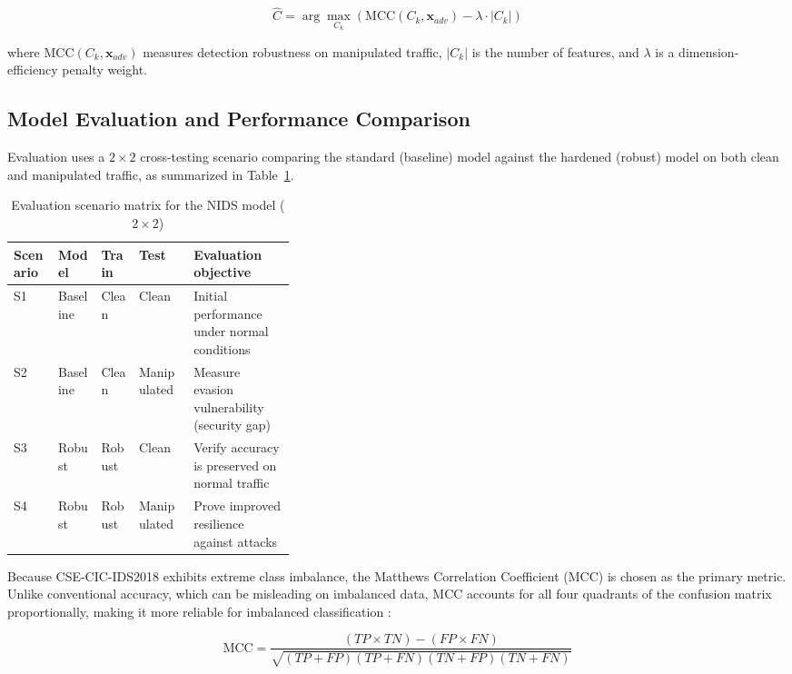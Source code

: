 \documentclass[11pt, a4paper]{article}
\begin{document}
\begin{equation}
\hat{C} = \arg\max_{C_k} \left( \text{MCC}(C_k, \mathbf{x}_{adv}) - \lambda \cdot |C_k| \right)
\end{equation}

where $\text{MCC}(C_k, \mathbf{x}_{adv})$ measures detection robustness on manipulated traffic, $|C_k|$ is the number of features, and $\lambda$ is a dimension-efficiency penalty weight.

\subsection{Model Evaluation and Performance Comparison}
Evaluation uses a $2\times 2$ cross-testing scenario comparing the standard (baseline) model against the hardened (robust) model on both clean and manipulated traffic, as summarized in Table~\ref{tab:scenario_2x2}.

\begin{table}[H]
\caption{Evaluation scenario matrix for the NIDS model ($2\times 2$)}
\label{tab:scenario_2x2}
\centering
\small
\begin{tabular}{@{} l l l l p{0.36\linewidth} @{}}
\toprule
\textbf{Scenario} & \textbf{Model} & \textbf{Train} & \textbf{Test} & \textbf{Evaluation objective} \\ \midrule
S1 & Baseline & Clean & Clean       & Initial performance under normal conditions \\
S2 & Baseline & Clean & Manipulated & Measure evasion vulnerability (security gap) \\
S3 & Robust   & Robust & Clean      & Verify accuracy is preserved on normal traffic \\
S4 & Robust   & Robust & Manipulated & Prove improved resilience against attacks \\ \bottomrule
\end{tabular}
\end{table}

Because CSE-CIC-IDS2018 exhibits extreme class imbalance, the Matthews Correlation Coefficient (MCC) \citep{ref_matthews} is chosen as the primary metric. Unlike conventional accuracy, which can be misleading on imbalanced data, MCC accounts for all four quadrants of the confusion matrix proportionally, making it more reliable for imbalanced classification \citep{ref_chicco}:

\begin{equation}
\text{MCC} = \frac{(TP \times TN) - (FP \times FN)}{\sqrt{(TP + FP)(TP + FN)(TN + FP)(TN + FN)}}
\end{equation}
\end{document}
